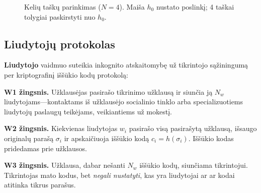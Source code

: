 \documentclass[11pt,a4paper,twocolumn]{article}
\begin{document}
\begin{figure}[ht]
\centering
{}
\caption{Kelių taškų parinkimas ($N{=}4$). Maiša $h_0$ nustato poslinkį; 4 taškai tolygiai paskirstyti nuo $h_0$.}
\label{fig:multipoint}
\end{figure}

\subsection{Liudytojų protokolas}

\textbf{Liudytojo} vaidmuo suteikia inkognito atskaitomybę už tikrintojo sąžiningumą per kriptografinį iššūkio kodų protokolą:

\textbf{W1 žingsnis.} Užklausėjas pasirašo tikrinimo užklausą ir siunčia ją $N_w$ liudytojams---kontaktams iš užklausėjo socialinio tinklo arba specializuotiems liudytojų paslaugų teikėjams, veikiantiems už mokestį.

\textbf{W2 žingsnis.} Kiekvienas liudytojas $w_i$ pasirašo visą pasirašytą užklausą, išsaugo originalų parašą $\sigma_i$ ir apskaičiuoja iššūkio kodą $c_i = h(\sigma_i)$. Iššūkio kodas pridedamas prie užklausos.

\textbf{W3 žingsnis.} Užklausa, dabar nešanti $N_w$ iššūkio kodų, siunčiama tikrintojui. Tikrintojas mato kodus, bet \emph{negali nustatyti}, kas yra liudytojai ar ar kodai atitinka tikrus parašus.
\end{document}
